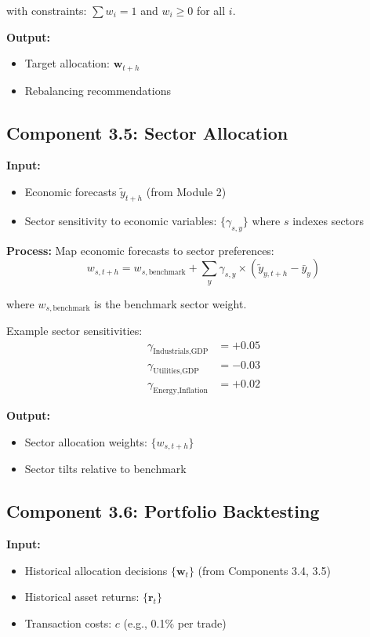 \documentclass[11pt,a4paper]{article}
\begin{document}
with constraints: $\sum w_i = 1$ and $w_i \geq 0$ for all $i$.

\textbf{Output:}
\begin{itemize}
    \item Target allocation: $\mathbf{w}_{t+h}$
    \item Rebalancing recommendations
\end{itemize}

\subsection{Component 3.5: Sector Allocation}

\textbf{Input:}
\begin{itemize}
    \item Economic forecasts $\tilde{y}_{t+h}$ (from Module 2)
    \item Sector sensitivity to economic variables: $\{\gamma_{s,y}\}$ where $s$ indexes sectors
\end{itemize}

\textbf{Process:}
Map economic forecasts to sector preferences:
\begin{equation}
    w_{s,t+h} = w_{s,\text{benchmark}} + \sum_{y} \gamma_{s,y} \times (\tilde{y}_{y,t+h} - \bar{y}_y)
\end{equation}

where $w_{s,\text{benchmark}}$ is the benchmark sector weight.

Example sector sensitivities:
\begin{align}
    \gamma_{\text{Industrials},\text{GDP}} &= +0.05 \\
    \gamma_{\text{Utilities},\text{GDP}} &= -0.03 \\
    \gamma_{\text{Energy},\text{Inflation}} &= +0.02
\end{align}

\textbf{Output:}
\begin{itemize}
    \item Sector allocation weights: $\{w_{s,t+h}\}$
    \item Sector tilts relative to benchmark
\end{itemize}

\subsection{Component 3.6: Portfolio Backtesting}

\textbf{Input:}
\begin{itemize}
    \item Historical allocation decisions $\{\mathbf{w}_t\}$ (from Components 3.4, 3.5)
    \item Historical asset returns: $\{\mathbf{r}_t\}$
    \item Transaction costs: $c$ (e.g., 0.1\% per trade)
\end{itemize}
\end{document}
